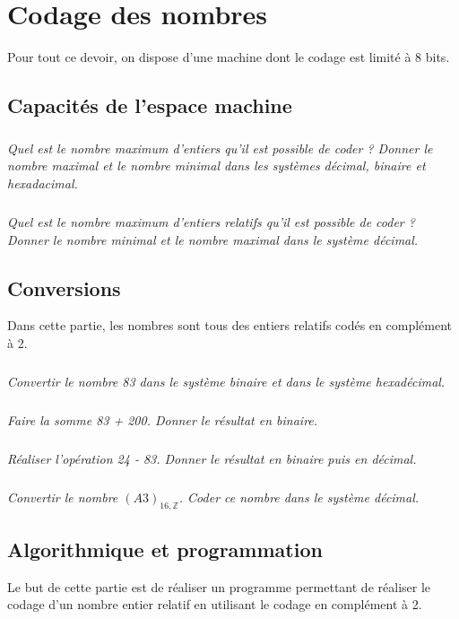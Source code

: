 \documentclass[10pt]{article}
\begin{document}




\section{Codage des nombres}
Pour tout ce devoir, on dispose d'une machine dont le codage est limité à 8 bits. 

\subsection{Capacités de l'espace machine}
\subparagraph{} \textit{Quel est le nombre maximum d'entiers qu'il est possible de coder ? Donner le nombre maximal et le nombre minimal dans les systèmes décimal, binaire et hexadacimal.}

\subparagraph{} \textit{Quel est le nombre maximum d'entiers relatifs qu'il est possible de coder ? Donner le nombre minimal et le nombre maximal dans le système décimal.}


\subsection{Conversions}
Dans cette partie, les nombres sont tous des entiers relatifs codés en complément à 2.
 
\subparagraph{} \textit{Convertir le nombre 83 dans le système binaire et dans le système hexadécimal.}


\subparagraph{} \textit{Faire la somme 83 + 200. Donner le résultat en binaire.}


\subparagraph{} \textit{Réaliser l'opération 24 - 83. Donner le résultat en binaire puis en décimal.}



\subparagraph{} \textit{Convertir le nombre $(A3)_{16,\mathbb{Z}}$. Coder ce nombre dans le système décimal.}


\subsection{Algorithmique et programmation}

Le but de cette partie est de réaliser un programme permettant de réaliser le codage d'un nombre entier relatif en utilisant le codage en complément à 2. 
\end{document}
